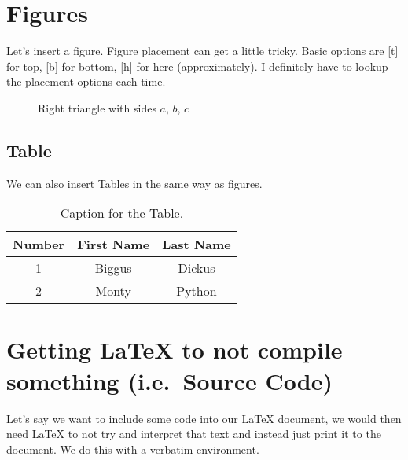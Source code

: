 \documentclass[12pt]{article}
\begin{document}
\section{Figures}

Let's insert a figure. Figure placement can get a little tricky.
Basic options are [t] for top, [b] for bottom, [h] for here (approximately).
I definitely have to lookup the placement options each time.

\begin{figure}[H] %
    \centering %
    \caption{Right triangle with sides $a$, $b$, $c$}
    \label{fig:right-triangle}
\end{figure}

\subsection{Table}
We can also insert Tables in the same way as figures.

\begin{table}[H]
  \caption{Caption for the Table.}
  \begin{tabular}{c|cc}  %
    Number &  First Name & Last Name \\ %
    \hline %
    1 & Biggus & Dickus \\
    2 & Monty & Python
  \end{tabular}
\end{table}

\section{Getting \LaTeX{} to not compile something (i.e.~Source Code)}
Let's say we want to include some code into our \LaTeX{} document,
we would then need \LaTeX{} to not try and interpret that text and
instead just print it to the document. We do this with a verbatim
environment.
\end{document}
